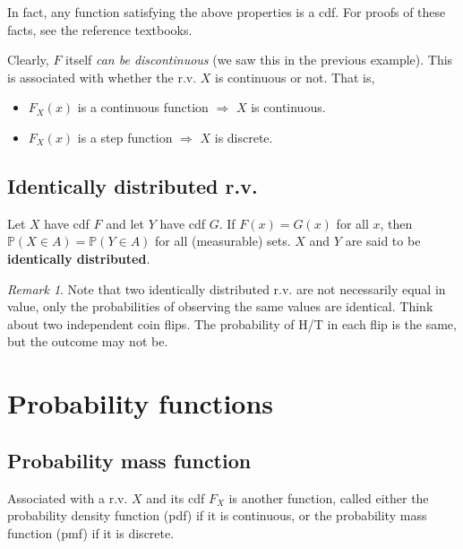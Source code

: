 \documentclass[
]{book}
\providecommand{\tightlist}{%
  \setlength{\itemsep}{0pt}\setlength{\parskip}{0pt}}
\newcommand{\bbP}{\mathbb{P}}
\theoremstyle{definition}
\theoremstyle{definition}
\theoremstyle{definition}
\theoremstyle{definition}
\theoremstyle{remark}
\newtheorem*{remark}{Remark}
\begin{document}
In fact, any function satisfying the above properties is a cdf.
For proofs of these facts, see the reference textbooks.

Clearly, \(F\) itself \emph{can be discontinuous} (we saw this in the previous example).
This is associated with whether the r.v. \(X\) is continuous or not. That is,

\begin{itemize}
\tightlist
\item
  \(F_X(x)\) is a continuous function \(\Rightarrow\) \(X\) is continuous.
\item
  \(F_X(x)\) is a step function \(\Rightarrow\) \(X\) is discrete.
\end{itemize}

\hypertarget{identically-distributed-r.v.}{%
\subsection{Identically distributed r.v.}\label{identically-distributed-r.v.}}

Let \(X\) have cdf \(F\) and let \(Y\) have cdf \(G\).
If \(F(x)=G(x)\) for all \(x\), then \(\bbP(X\in A) = \bbP(Y \in A)\) for all (measurable) sets.
\(X\) and \(Y\) are said to be \textbf{identically distributed}.

\begin{remark}
Note that two identically distributed r.v. are not necessarily equal in value, only the probabilities of observing the same values are identical.
Think about two independent coin flips. The probability of H/T in each flip is the same, but the outcome may not be.
\end{remark}

\hypertarget{probability-functions}{%
\section{Probability functions}\label{probability-functions}}

\hypertarget{probability-mass-function}{%
\subsection{Probability mass function}\label{probability-mass-function}}

Associated with a r.v. \(X\) and its cdf \(F_X\) is another function, called either the probability density function (pdf) if it is continuous, or the probability mass function (pmf) if it is discrete.
\end{document}
